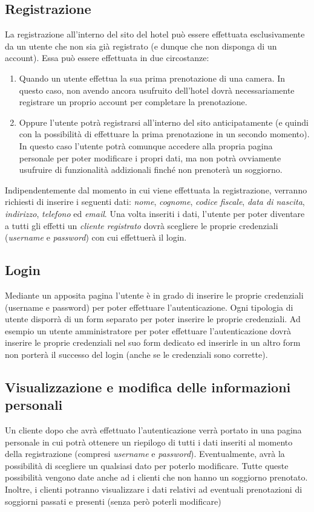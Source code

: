 \documentclass [a4paper, 12pt]{book}
\begin{document}
\subsection{Registrazione}
La registrazione all'interno del sito del hotel può essere effettuata esclusivamente da un utente che non sia già registrato (e dunque che non disponga di un account). Essa può essere effettuata in due circostanze:
\begin{enumerate}
\item Quando un utente effettua la sua prima prenotazione di una camera. In questo caso, non avendo ancora usufruito dell'hotel dovrà necessariamente registrare un proprio account per completare la prenotazione.
\item Oppure l'utente potrà registrarsi all'interno del sito anticipatamente (e quindi con la possibilità di effettuare la prima prenotazione in un secondo momento). In questo caso l'utente potrà comunque accedere alla propria pagina personale per poter modificare i propri dati, ma non potrà ovviamente usufruire di funzionalità addizionali finché non prenoterà un soggiorno.
\end{enumerate}
Indipendentemente dal momento in cui viene effettuata la registrazione, verranno richiesti di inserire i seguenti dati: \textit{nome}, \textit{cognome}, \textit{codice fiscale}, \textit{data di nascita}, \textit{indirizzo}, \textit{telefono} ed \textit{email}. Una volta inseriti i dati, l'utente per poter diventare a tutti gli effetti un \textit{cliente registrato} dovrà scegliere le proprie credenziali (\textit{username} e \textit{password}) con cui effettuerà il login.

\medskip

\subsection{Login}
\label{Login}
Mediante un apposita pagina l'utente è in grado di inserire le proprie credenziali (username e password) per poter effettuare l'autenticazione. Ogni tipologia di utente disporrà di un form separato per poter inserire le proprie credenziali. Ad esempio un utente amministratore per poter effettuare l'autenticazione dovrà inserire le proprie credenziali nel suo form dedicato ed inserirle in un altro form non porterà il successo del login (anche se le credenziali sono corrette). 

\medskip

\subsection{Visualizzazione e modifica delle informazioni personali}
Un cliente dopo che avrà effettuato l'autenticazione verrà portato in una pagina personale in cui potrà ottenere un riepilogo di tutti i dati inseriti al momento della registrazione (compresi \textit{username} e \textit{password}). Eventualmente, avrà la possibilità di scegliere un qualsiasi dato per poterlo modificare. Tutte queste possibilità vengono date anche ad i clienti che non hanno un soggiorno prenotato. Inoltre, i clienti potranno visualizzare i dati relativi ad eventuali prenotazioni di soggiorni passati e presenti (senza però poterli modificare)
\end{document}

